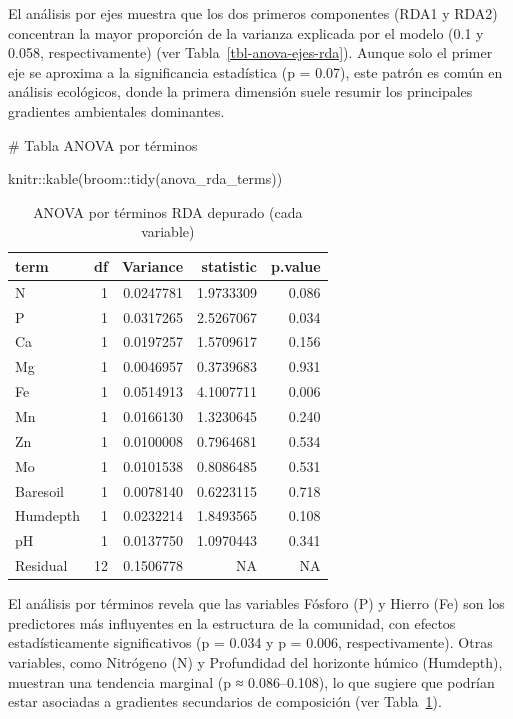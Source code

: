 \documentclass[
  spanish,
  11pt,
  a4paper,
  DIV=11,
  numbers=noendperiod]{scrartcl}
\newenvironment{Shaded}{\begin{snugshade}}{\end{snugshade}}
\newcommand{\CommentTok}[1]{\textcolor[rgb]{0.37,0.37,0.37}{#1}}
\newcommand{\FunctionTok}[1]{\textcolor[rgb]{0.28,0.35,0.67}{#1}}
\newcommand{\NormalTok}[1]{\textcolor[rgb]{0.00,0.23,0.31}{#1}}
\newcommand{\SpecialCharTok}[1]{\textcolor[rgb]{0.37,0.37,0.37}{#1}}
\begin{document}
El análisis por ejes muestra que los dos primeros componentes (RDA1 y
RDA2) concentran la mayor proporción de la varianza explicada por el
modelo (0.1 y 0.058, respectivamente) (ver
Tabla~\ref{tbl-anova-ejes-rda}). Aunque solo el primer eje se aproxima a
la significancia estadística (p = 0.07), este patrón es común en
análisis ecológicos, donde la primera dimensión suele resumir los
principales gradientes ambientales dominantes.

\begin{Shaded}
\begin{Highlighting}[numbers=left,,]
\CommentTok{\# Tabla ANOVA por términos}

\NormalTok{knitr}\SpecialCharTok{::}\FunctionTok{kable}\NormalTok{(broom}\SpecialCharTok{::}\FunctionTok{tidy}\NormalTok{(anova\_rda\_terms))}
\end{Highlighting}
\end{Shaded}

\begin{longtable}[]{@{}lrrrr@{}}

\caption{\label{tbl-anova-terminos-rda}ANOVA por términos RDA depurado
(cada variable)}

\tabularnewline

\toprule\noalign{}
term & df & Variance & statistic & p.value \\
\midrule\noalign{}
\endhead
\bottomrule\noalign{}
\endlastfoot
N & 1 & 0.0247781 & 1.9733309 & 0.086 \\
P & 1 & 0.0317265 & 2.5267067 & 0.034 \\
Ca & 1 & 0.0197257 & 1.5709617 & 0.156 \\
Mg & 1 & 0.0046957 & 0.3739683 & 0.931 \\
Fe & 1 & 0.0514913 & 4.1007711 & 0.006 \\
Mn & 1 & 0.0166130 & 1.3230645 & 0.240 \\
Zn & 1 & 0.0100008 & 0.7964681 & 0.534 \\
Mo & 1 & 0.0101538 & 0.8086485 & 0.531 \\
Baresoil & 1 & 0.0078140 & 0.6223115 & 0.718 \\
Humdepth & 1 & 0.0232214 & 1.8493565 & 0.108 \\
pH & 1 & 0.0137750 & 1.0970443 & 0.341 \\
Residual & 12 & 0.1506778 & NA & NA \\

\end{longtable}

El análisis por términos revela que las variables Fósforo (P) y Hierro
(Fe) son los predictores más influyentes en la estructura de la
comunidad, con efectos estadísticamente significativos (p = 0.034 y p =
0.006, respectivamente). Otras variables, como Nitrógeno (N) y
Profundidad del horizonte húmico (Humdepth), muestran una tendencia
marginal (p ≈ 0.086--0.108), lo que sugiere que podrían estar asociadas
a gradientes secundarios de composición (ver
Tabla~\ref{tbl-anova-terminos-rda}).
\end{document}
